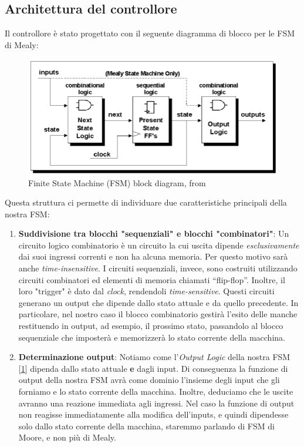 \documentclass[a4paper,11pt]{article}
\newcommand{\inctxt}[1]{\textit{\fontfamily{zi4}\selectfont #1}}
\begin{document}
  \subsection{Architettura del controllore}
Il controllore è stato progettato con il seguente diagramma di blocco per le FSM di Mealy:
 \begin{figure}[hbt!]
     \centering
     \label{fig:FSM-block-diagram}
    \includegraphics[width=13cm]{assets/FSM/Finite-State-Machine-FSM-block-diagram.png}
    \caption{Finite State Machine (FSM) block diagram, from \cite{paper1}}
  \end{figure}
Questa struttura ci permette di individuare due caratteristiche principali della nostra FSM:
  \begin{enumerate}
    \item \textbf{Suddivisione tra blocchi "sequenziali" e blocchi "combinatori"}: Un circuito logico combinatorio è un circuito la cui uscita dipende \textit{esclusivamente} dai suoi ingressi correnti e non ha alcuna memoria. Per questo motivo sarà anche \textit{time-insensitive}. I circuiti sequenziali, invece, sono costruiti utilizzando circuiti combinatori ed elementi di memoria chiamati “flip-flop”. Inoltre, il loro "trigger" è dato dal \inctxt{clock}, rendendoli \textit{time-sensitive}. Questi circuiti generano un output che dipende dallo stato attuale e da quello precedente. In particolare, nel nostro caso il blocco combinatorio gestirà l'esito delle manche restituendo in output, ad esempio, il prossimo stato, passandolo al blocco sequenziale che imposterà e memorizzerà lo stato corrente della macchina.

    \item \textbf{Determinazione output}: Notiamo come l'\inctxt{Output Logic} della nostra FSM [\ref{fig:FSM-block-diagram}] dipenda dallo stato attuale \textbf{e} dagli input. Di conseguenza la funzione di output della nostra FSM avrà come dominio l'insieme degli input che gli forniamo e lo stato corrente della macchina. Inoltre, deduciamo che le uscite avranno una reazione immediata agli ingressi. Nel caso la funzione di output non reagisse immediatamente alla modifica dell'inputs, e quindi dipendesse solo dallo stato corrente della macchina, staremmo parlando di FSM di Moore, e non più di Mealy.
  \end{enumerate}
\end{document}

